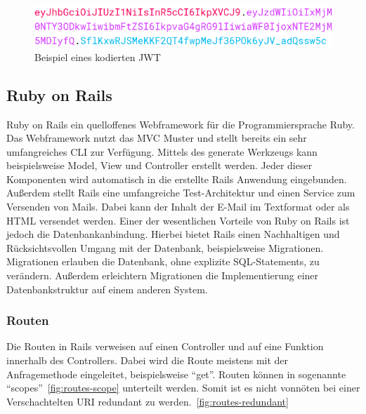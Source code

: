 \begin{figure}[h]
	\centering
	\includegraphics[width=\linewidth]{graphics/jwt-encoded.png}
	\caption{Beispiel eines kodierten \gls{JWT} }
	\label{fig:jwt-encoded}
\end{figure}

\subsection{Ruby on Rails}
\label{sec: rails}
Ruby on Rails ein quelloffenes Webframework für die Programmiersprache Ruby. Das Webframework nutzt das \gls{MVC} Muster und stellt bereits ein sehr umfangreiches \gls{CLI} zur Verfügung. Mittels des generate Werkzeugs kann beispielsweise Model, View und Controller erstellt werden. Jeder dieser Komponenten wird automatisch in die erstellte Rails Anwendung eingebunden. Außerdem stellt Rails eine umfangreiche Test-Architektur und einen Service zum Versenden von Mails. Dabei kann der Inhalt der E-Mail im Textformat oder als \gls{HTML} versendet werden. Einer der wesentlichen Vorteile von Ruby on Rails ist jedoch die Datenbankanbindung. Hierbei bietet Rails einen Nachhaltigen und Rücksichtsvollen Umgang mit der Datenbank, beispielsweise Migrationen. Migrationen erlauben die Datenbank, ohne explizite SQL-Statements, zu verändern. Außerdem erleichtern Migrationen die Implementierung einer Datenbankstruktur auf einem anderen System.

\subsubsection{Routen}
\label{sec: routen}
Die Routen in Rails verweisen auf einen Controller und auf eine Funktion innerhalb des Controllers. Dabei wird die Route meistens mit der Anfragemethode eingeleitet, beispielsweise \enquote{get}. Routen können in sogenannte \enquote{scopes}~\ref{fig:routes-scope} unterteilt werden. Somit ist es nicht vonnöten bei einer Verschachtelten \gls{URI} redundant zu werden.~\ref{fig:routes-redundant}

\begin{minipage}{\linewidth}
	
\end{minipage}


